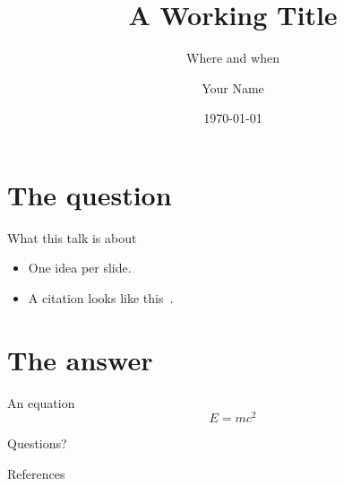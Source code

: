 \documentclass[aspectratio=169]{beamer}
\title{A Working Title}
\subtitle{Where and when}
\author{Your Name}
\institute{Your Institution}
\date{\today}
\begin{document}
\maketitle

\section{The question}

\begin{frame}{What this talk is about}
  \begin{itemize}
    \item One idea per slide.
    \item A citation looks like this~\parencite{knuth1984}.
  \end{itemize}
\end{frame}

\section{The answer}

\begin{frame}{An equation}
  \begin{equation*}
    E = mc^2
  \end{equation*}
\end{frame}

\begin{frame}[standout]
  Questions?
\end{frame}

\begin{frame}{References}
  \printbibliography
\end{frame}
\end{document}
